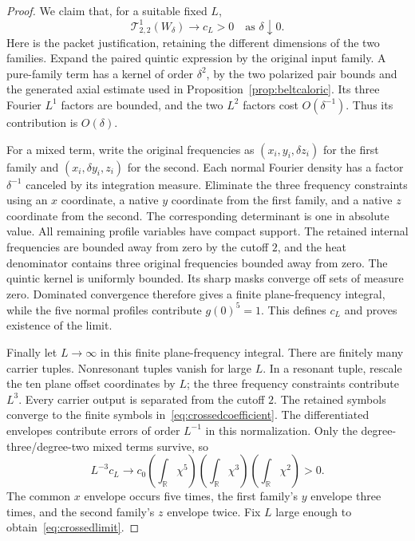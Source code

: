 \documentclass[11pt]{article}
\newcommand{\R}{\mathbb R}
\begin{document}
\begin{proof}
We claim that, for a suitable fixed $L$,
\begin{equation}\label{eq:crossedlimit}
 \mathcal T_{2,2}^1(W_\delta)\longrightarrow c_L>0
       \quad\text{as }\delta\downarrow0.
\end{equation}
Here is the packet justification, retaining the different dimensions
of the two families. Expand the paired quintic expression by the
original input family. A pure-family term has a kernel of order
$\delta^2$, by the two polarized pair bounds and the generated axial
estimate used in Proposition~\ref{prop:beltcaloric}. Its three Fourier
$L^1$ factors are bounded, and the two $L^2$ factors cost $O(\delta^{-1})$.
Thus its contribution is $O(\delta)$.

For a mixed term, write the original frequencies as
$(x_i,y_i,\delta z_i)$ for the first family and
$(x_i,\delta y_i,z_i)$ for the second. Each normal Fourier density
has a factor $\delta^{-1}$ canceled by its integration measure.
Eliminate the three frequency constraints using an $x$ coordinate,
a native $y$ coordinate from the first family, and a native $z$
coordinate from the second. The corresponding determinant is one
in absolute value. All remaining profile variables have compact
support. The retained internal frequencies are bounded away from zero
by the cutoff $2$, and the heat denominator contains three original
frequencies bounded away from zero. The quintic kernel is uniformly
bounded. Its sharp masks converge off sets of measure zero.
Dominated convergence therefore gives a finite plane-frequency
integral, while the five normal profiles contribute $g(0)^5=1$.
This defines $c_L$ and proves existence of the limit.

Finally let $L\to\infty$ in this finite plane-frequency integral.
There are finitely many carrier tuples. Nonresonant tuples vanish
for large $L$. In a resonant tuple, rescale the ten plane offset
coordinates by $L$; the three frequency constraints contribute $L^3$.
Every carrier output is separated from the cutoff $2$.
The retained symbols converge to the finite symbols
in~\eqref{eq:crossedcoefficient}. The differentiated envelopes
contribute errors of order $L^{-1}$ in this normalization.
Only the degree-three/degree-two mixed terms survive, so
\begin{equation}\label{eq:crossedpacket}
 L^{-3}c_L\longrightarrow
 c_0\left(\int_\R\chi^5\right)
     \left(\int_\R\chi^3\right)
     \left(\int_\R\chi^2\right)>0.
\end{equation}
The common $x$ envelope occurs five times, the first family's $y$
envelope three times, and the second family's $z$ envelope twice.
Fix $L$ large enough to obtain~\eqref{eq:crossedlimit}.


\end{proof}
\end{document}
